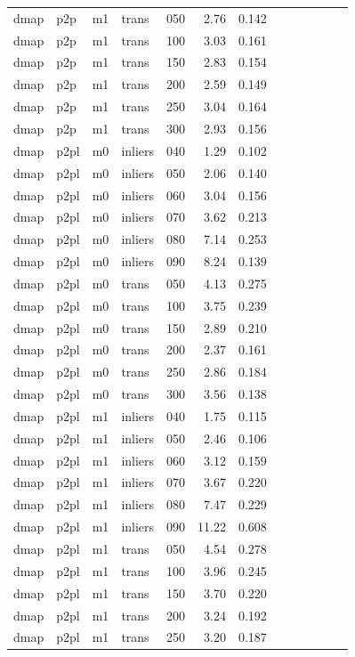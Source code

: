 \begin{table}[htbp]
\begin{tabular}{lllllrrrrrrrr}
  dmap & p2p & m1 & trans & 050 & 2.76 & 0.142 \\
  dmap & p2p & m1 & trans & 100 & 3.03 & 0.161 \\
  dmap & p2p & m1 & trans & 150 & 2.83 & 0.154 \\
  dmap & p2p & m1 & trans & 200 & 2.59 & 0.149 \\
  dmap & p2p & m1 & trans & 250 & 3.04 & 0.164 \\
  dmap & p2p & m1 & trans & 300 & 2.93 & 0.156 \\
  dmap & p2pl & m0 & inliers & 040 & 1.29 & 0.102 \\
  dmap & p2pl & m0 & inliers & 050 & 2.06 & 0.140 \\
  dmap & p2pl & m0 & inliers & 060 & 3.04 & 0.156 \\
  dmap & p2pl & m0 & inliers & 070 & 3.62 & 0.213 \\
  dmap & p2pl & m0 & inliers & 080 & 7.14 & 0.253 \\
  dmap & p2pl & m0 & inliers & 090 & 8.24 & 0.139 \\
  dmap & p2pl & m0 & trans & 050 & 4.13 & 0.275 \\
  dmap & p2pl & m0 & trans & 100 & 3.75 & 0.239 \\
  dmap & p2pl & m0 & trans & 150 & 2.89 & 0.210 \\
  dmap & p2pl & m0 & trans & 200 & 2.37 & 0.161 \\
  dmap & p2pl & m0 & trans & 250 & 2.86 & 0.184 \\
  dmap & p2pl & m0 & trans & 300 & 3.56 & 0.138 \\
  dmap & p2pl & m1 & inliers & 040 & 1.75 & 0.115 \\
  dmap & p2pl & m1 & inliers & 050 & 2.46 & 0.106 \\
  dmap & p2pl & m1 & inliers & 060 & 3.12 & 0.159 \\
  dmap & p2pl & m1 & inliers & 070 & 3.67 & 0.220 \\
  dmap & p2pl & m1 & inliers & 080 & 7.47 & 0.229 \\
  dmap & p2pl & m1 & inliers & 090 & 11.22 & 0.608 \\
  dmap & p2pl & m1 & trans & 050 & 4.54 & 0.278 \\
  dmap & p2pl & m1 & trans & 100 & 3.96 & 0.245 \\
  dmap & p2pl & m1 & trans & 150 & 3.70 & 0.220 \\
  dmap & p2pl & m1 & trans & 200 & 3.24 & 0.192 \\
  dmap & p2pl & m1 & trans & 250 & 3.20 & 0.187 \\

\end{tabular}
\end{table}
